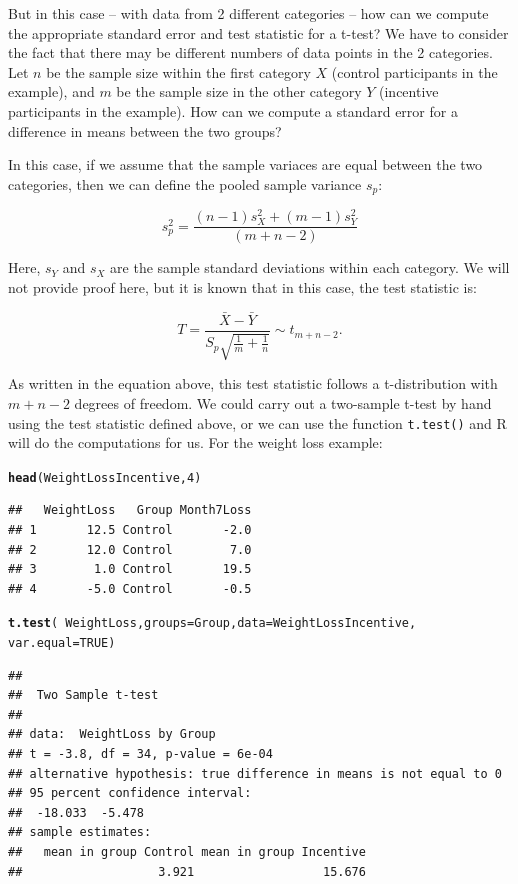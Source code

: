 \documentclass[twoside]{book}\usepackage[]{graphicx}\usepackage[]{xcolor}
\makeatletter
\newcommand{\hlnum}[1]{\textcolor[rgb]{0.686,0.059,0.569}{#1}}%
\newcommand{\hlopt}[1]{\textcolor[rgb]{0,0,0}{#1}}%
\newcommand{\hlstd}[1]{\textcolor[rgb]{0.345,0.345,0.345}{#1}}%
\newcommand{\hlkwc}[1]{\textcolor[rgb]{0.333,0.667,0.333}{#1}}%
\newcommand{\hlkwd}[1]{\textcolor[rgb]{0.737,0.353,0.396}{\textbf{#1}}}%
\newenvironment{kframe}{%
 \def\at@end@of@kframe{}%
 \ifinner\ifhmode%
  \def\at@end@of@kframe{\end{minipage}}%
  \begin{minipage}{\columnwidth}%
 \fi\fi%
 \def\FrameCommand##1{\hskip\@totalleftmargin \hskip-\fboxsep
 \colorbox{shadecolor}{##1}\hskip-\fboxsep
     \hskip-\linewidth \hskip-\@totalleftmargin \hskip\columnwidth}%
 \MakeFramed {\advance\hsize-\width
   \@totalleftmargin\z@ \linewidth\hsize
   \@setminipage}}%
 {\par\unskip\endMakeFramed%
 \at@end@of@kframe}
\newenvironment{knitrout}{}{} %
\newcounter{example}[section]
\makeatother
\begin{document}
But in this case -- with data from 2 different categories -- how can we compute the appropriate standard error and test statistic for a t-test?  We have to consider the fact that there may be different numbers of data points in the 2 categories.  Let $n$ be the sample size within the first category $X$ (control participants in the example), and $m$ be the sample size in the other category $Y$ (incentive participants in the example). How can we compute a standard error for a difference in means between the two groups?

In this case, if we assume that the sample variaces are equal between the two categories, then we can define the pooled sample variance $s_p$:

$$s^2_p = \frac{(n-1)s_X^2 + (m-1)s_Y^2}{(m+n-2)}$$

Here, $s_Y$ and $s_X$ are the sample standard deviations within each category.  We will not provide proof here, but it is known that in this case, the test statistic is:

\[
T = \frac{\bar{X}-\bar{Y}}{S_p\sqrt{\frac{1}{m}+\frac{1}{n}}}
\sim t_{m+n-2}.
\]

As written in the equation above, this test statistic follows a t-distribution with $m+n-2$ degrees of freedom.  We could carry out a two-sample t-test by hand using the test statistic defined above, or we can use the function \texttt{t.test()} and R will do the computations for us. For the weight loss example:

\begin{knitrout}
\color{fgcolor}\begin{kframe}
\begin{alltt}
\hlkwd{head}\hlstd{(WeightLossIncentive,} \hlnum{4}\hlstd{)}
\end{alltt}
\begin{verbatim}
##   WeightLoss   Group Month7Loss
## 1       12.5 Control       -2.0
## 2       12.0 Control        7.0
## 3        1.0 Control       19.5
## 4       -5.0 Control       -0.5
\end{verbatim}
\begin{alltt}
\hlkwd{t.test}\hlstd{(} \hlopt{~} \hlstd{WeightLoss,} \hlkwc{groups} \hlstd{= Group,} \hlkwc{data} \hlstd{= WeightLossIncentive,}
       \hlkwc{var.equal} \hlstd{=} \hlnum{TRUE}\hlstd{)}
\end{alltt}
\begin{verbatim}
## 
## 	Two Sample t-test
## 
## data:  WeightLoss by Group
## t = -3.8, df = 34, p-value = 6e-04
## alternative hypothesis: true difference in means is not equal to 0
## 95 percent confidence interval:
##  -18.033  -5.478
## sample estimates:
##   mean in group Control mean in group Incentive 
##                   3.921                  15.676
\end{verbatim}
\end{kframe}
\end{knitrout}
\end{document}
